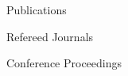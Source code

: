 
\begin{rSection}{Publications}
  \begin{rSubsection}{Refereed Journals}{}{}{}
    \printbibliography[keyword=journal,heading=none]
  \end{rSubsection}
  \begin{rSubsection}{Conference Proceedings}{}{}{}
    \printbibliography[keyword=proceeding,heading=none]
  \end{rSubsection}

\end{rSection}
